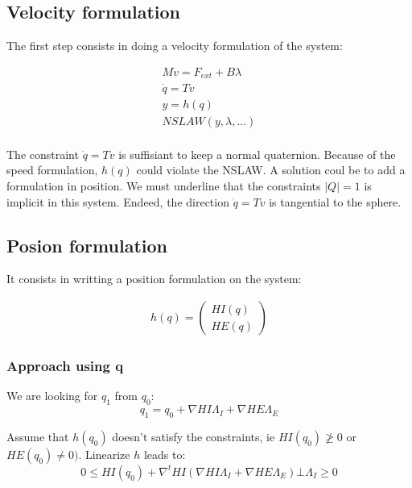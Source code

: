 \subsection{Velocity formulation}

The first step consists in doing a velocity formulation of the system:

\begin{equation}
\label{NE_Dyn1}
\begin{array}{l}
  M \dot v = F_{ext}+B \lambda \\
  \dot q = T v\\
  y=h(q) \\
  NSLAW(y,\lambda,...)\\
\end{array}
\end{equation}

The constraint $\dot q = T v$ is suffisiant to keep a normal quaternion. Because of the speed formulation, $h(q)$ could violate the NSLAW. A solution coul be to add a formulation in position. We must underline that the constraints $\mid Q \mid = 1$ is implicit in this system. Endeed, the direction  $\dot q = T v$ is tangential to the sphere. 


\subsection{Posion formulation}

It consists in writting a position formulation on the system:

\begin{equation}
\label{NE_Dyn1}
\begin{array}{l}
h(q) = \left(\begin{array}{l}
  HI(q)\\HE(q)
\end{array}\right)
\end{array}
\end{equation}

\subsubsection{Approach using q}

We are looking for $q_1$ from $q_0$:\\
\begin{equation}
  q_1=q_0+\nabla HI \Lambda _I + \nabla HE \Lambda _E
\end{equation}

Assume that $h(q_0)$ doesn't satisfy the constraints, ie $ HI(q_0) \ngeq 0$ or $ HE(q_0) \neq 0)$. Linearize $h$ leads to:\\
\begin{equation}
  0 \leq HI(q_0) + \nabla ^t HI (\nabla HI  \Lambda _I + \nabla HE \Lambda _E) \bot \Lambda _I \geq 0
\end{equation}

